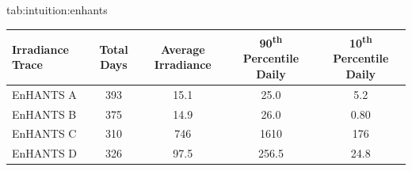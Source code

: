 \begin{definetable*}{tab:intuition:enhants}
            \small
            \begin{tabularx}{\columnwidth}{l | S[table-format=3] | S[table-format=3.1] | S[table-format=4.1] | S[table-format=3.1] }
                Irradiance Trace & {Total Days} & {Average Irradiance} & {90\textsuperscript{th} Percentile Daily} & {10\textsuperscript{th} Percentile Daily} \\
                \hline
                EnHANTS A   & 393  & 15.1     & 25.0      & 5.2\\
                EnHANTS B   & 375  & 14.9     & 26.0      & 0.80\\
                EnHANTS C   & 310  & 746      & 1610      & 176\\
                EnHANTS D   & 326  & 97.5     & 256.5     & 24.8\\
            \end{tabularx}
            \caption{Summary statistics for the indoor photovoltaic irradiance traces from the EnHANTs dataset~\cite{gorlatova2013networking}.
            Irradiance is expressed in units of \ssi[per-mode=symbol]{\micro\watt\per\centi\meter\squared}.
            }
\end{definetable*}


